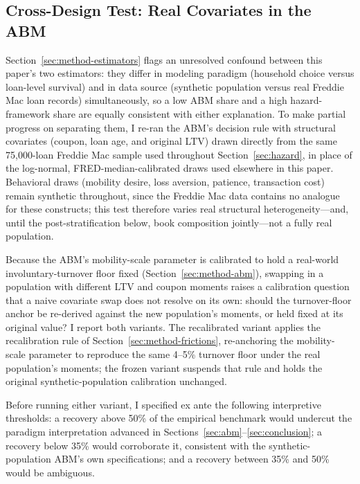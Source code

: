 \documentclass[12pt]{article}
\begin{document}
\subsection{Cross-Design Test: Real Covariates in the ABM}\label{sec:robustness-crossdesign}

Section~\ref{sec:method-estimators} flags an unresolved confound between this paper's two estimators: they differ in modeling paradigm (household choice versus loan-level survival) and in data source (synthetic population versus real Freddie Mac loan records) simultaneously, so a low ABM share and a high hazard-framework share are equally consistent with either explanation. To make partial progress on separating them, I re-ran the ABM's decision rule with structural covariates (coupon, loan age, and original LTV) drawn directly from the same 75,000-loan Freddie Mac sample used throughout Section~\ref{sec:hazard}, in place of the log-normal, FRED-median-calibrated draws used elsewhere in this paper. Behavioral draws (mobility desire, loss aversion, patience, transaction cost) remain synthetic throughout, since the Freddie Mac data contains no analogue for these constructs; this test therefore varies real structural heterogeneity---and, until the post-stratification below, book composition jointly---not a fully real population.

Because the ABM's mobility-scale parameter is calibrated to hold a real-world involuntary-turnover floor fixed (Section~\ref{sec:method-abm}), swapping in a population with different LTV and coupon moments raises a calibration question that a naive covariate swap does not resolve on its own: should the turnover-floor anchor be re-derived against the new population's moments, or held fixed at its original value? I report both variants. The recalibrated variant applies the recalibration rule of Section~\ref{sec:method-frictions}, re-anchoring the mobility-scale parameter to reproduce the same 4--5\% turnover floor under the real population's moments; the frozen variant suspends that rule and holds the original synthetic-population calibration unchanged.

Before running either variant, I specified ex ante the following interpretive thresholds: a recovery above 50\% of the empirical benchmark would undercut the paradigm interpretation advanced in Sections~\ref{sec:abm}--\ref{sec:conclusion}; a recovery below 35\% would corroborate it, consistent with the synthetic-population ABM's own specifications; and a recovery between 35\% and 50\% would be ambiguous.
\end{document}
